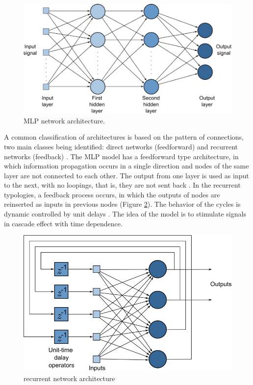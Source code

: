 \begin{figure}
    \centering
    \includegraphics[scale=0.65]{"Part 3 - Learning Systems/Supervised Learning/Deep Learning/images/figure108.png"}
    \caption{MLP network architecture.}
    \label{fig:figure108}
\end{figure}

A common classification of architectures is based on the pattern of connections, two main classes being identified: direct networks (feedforward) and recurrent networks (feedback) \cite{haykin1999}. The MLP model has a feedforward type architecture, in which information propagation occurs in a single direction and nodes of the same layer are not connected to each other. The output from one layer is used as input to the next, with no loopings, that is, they are not sent back \cite{haykin1999}.
In the recurrent typologies, a feedback process occurs, in which the outputs of nodes are reinserted as inputs in previous nodes (Figure \ref{fig:figure109}). The behavior of the cycles is dynamic controlled by unit delays \cite{haykin1999}. The idea of the model is to stimulate signals in cascade effect with time dependence.

\begin{figure}
    \centering
    \includegraphics[scale=0.65]{"Part 3 - Learning Systems/Supervised Learning/Deep Learning/images/figure109.png"}
    \caption{recurrent network architecture \cite{haykin1999}}
    \label{fig:figure109}
\end{figure}

